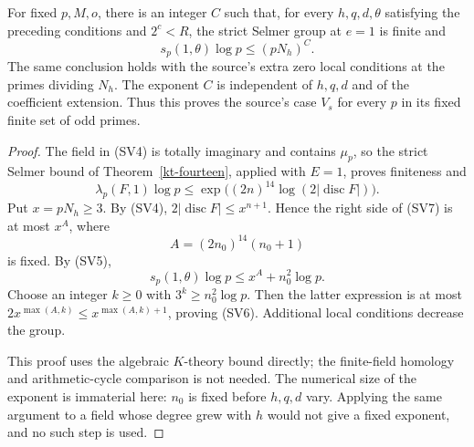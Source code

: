 \begin{theorem}\label{sv-exact-case}
For fixed $p,M,o$, there is an integer $C$ such that, for every
$h,q,d,\theta$ satisfying the preceding conditions and $2^c<R$,
the strict Selmer group at $e=1$ is finite and
\[
                           s_p(1,\theta)\log p\le(pN_h)^C.
                                                               \tag{SV6}
\]
The same conclusion holds with the source's extra zero local
conditions at the primes dividing $N_h$.
The exponent $C$ is independent of $h,q,d$ and of the coefficient
extension. Thus this proves the source's case $V_s$ for every
$p$ in its fixed finite set of odd primes.
\end{theorem}
\begin{proof}
The field in (SV4) is totally imaginary and contains $\mu_p$,
so the strict Selmer bound of Theorem~\ref{kt-fourteen}, applied
with $E=1$, proves finiteness and
\[
 \lambda_p(F,1)\log p
 \le\exp\bigl((2n)^{14}\log(2|\operatorname{disc}F|)\bigr).
                                                               \tag{SV7}
\]
Put $x=pN_h\ge3$. By (SV4),
$2|\operatorname{disc}F|\le x^{n+1}$. Hence the right side
of (SV7) is at most $x^A$, where
\[
                            A=(2n_0)^{14}(n_0+1)
                                                               \tag{SV8}
\]
is fixed. By (SV5),
\[
                       s_p(1,\theta)\log p
                                      \le x^A+n_0^2\log p.
\]
Choose an integer $k\ge0$ with $3^k\ge n_0^2\log p$.
Then the latter expression is at most
$2x^{\max(A,k)}\le x^{\max(A,k)+1}$, proving (SV6).
Additional local conditions decrease the group.

This proof uses the algebraic $K$-theory bound directly;
the finite-field homology and arithmetic-cycle comparison
is not needed. The numerical size of the exponent is immaterial here:
$n_0$ is fixed before $h,q,d$ vary. Applying the same argument to a field
whose degree grew with $h$ would not give a fixed exponent,
and no such step is used.
\end{proof}

